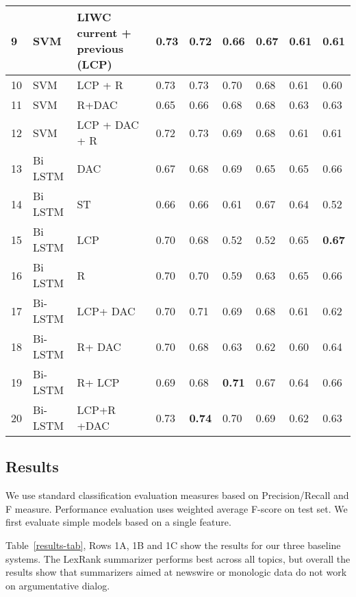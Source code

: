 \documentclass[11pt]{article}
\begin{document}
\begin{table*}[ht!]
\begin{small}
\begin{tabular}{|p{0.18cm} | p{1.3cm} | p{2.7cm} | p{1.2cm}    |   p{1.2cm} || p{1.2cm}    |   p{1.2cm} || p{1.2cm}    |   p{1.2cm}  | }
9 & SVM &LIWC current + previous {\bf (LCP) } &  0.73& 0.72 & 0.66 &0.67&  0.61 & 0.61\\  \hline
10 & SVM &LCP  +  R                & 0.73 &     0.73        &0.70 & 0.68 &  0.61 & 0.60 \\  \hline
11& SVM & R+DAC                     & 0.65       &0.66      &0.68  &  0.68&   0.63 &0.63 \\ \hline
12 & SVM &LCP + DAC + R        &  0.72      & 0.73    &0.69&  0.68  &  0.61 & 0.61 \\  \hline
13 & Bi LSTM  &     DAC              &  0.67    &0.68      &0.69 &0.65    &0.65& 0.66\\  \hline
14& Bi LSTM  &      ST                 &  0.66    &0.66       & 0.61   &0.67    &0.64& 0.52\\  \hline
15 & Bi LSTM  &      LCP              &  0.70    & 0.68       & 0.52 &0.52     &0.65& {\bf 0.67}\\  \hline
16 & Bi LSTM  &      R                  &  0.70    & 0.70        &0.59&0.63      &0.65&  0.66\\  \hline
17 & Bi-LSTM & LCP+ DAC        &   0.70     &  0.71      & 0.69 & 0.68     &0.61& 0.62  \\  \hline
18 & Bi-LSTM & R+ DAC             &   0.70    & 0.68      &  0.63&0.62        & 0.60& 0.64  \\  \hline
19 & Bi-LSTM & R+ LCP               &    0.69  &  0.68   &{\bf 0.71} & 0.67     & 0.64  &  0.66       \\  \hline
20 & Bi-LSTM & LCP+R +DAC    &  0.73      & {\bf 0.74}  & 0.70  &0.69 &      0.62 & 0.63\\  \hline


\end{tabular}
\caption{\label{results-tab} Results for classification on test set for each topic. Best performing model in {\bf bold.} }
\end{small}
\end{table*}
\captionsetup{font=scriptsize}


\subsection{Results}
We use standard classification evaluation measures based on
Precision/Recall and F measure. Performance evaluation uses weighted
average F-score on test set.  We first evaluate simple models based on
a single feature. 

  Table~\ref{results-tab}, Rows
1A, 1B and 1C show the results for our three baseline systems. The
LexRank summarizer performs best across all topics, but overall the
results show that summarizers aimed at newswire or monologic data do
not work on argumentative dialog.
\end{document}

